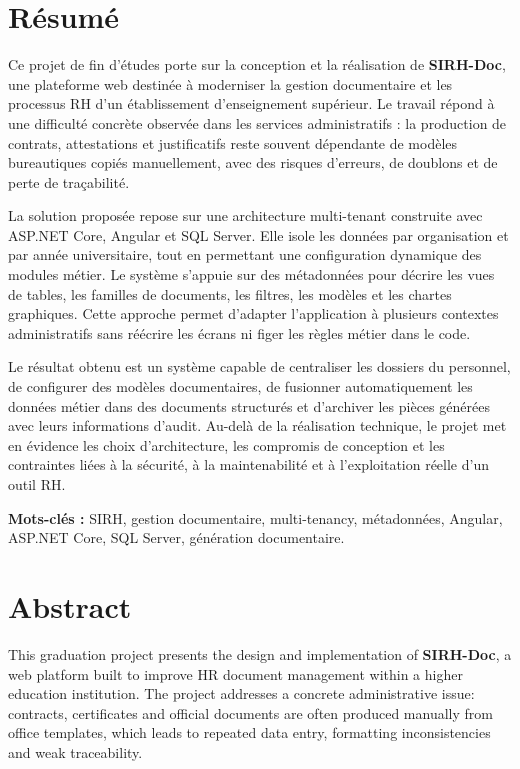 \chapter*{Résumé}

Ce projet de fin d'études porte sur la conception et la réalisation de \textbf{SIRH-Doc}, une plateforme web destinée à moderniser la gestion documentaire et les processus RH d'un établissement d'enseignement supérieur. Le travail répond à une difficulté concrète observée dans les services administratifs : la production de contrats, attestations et justificatifs reste souvent dépendante de modèles bureautiques copiés manuellement, avec des risques d'erreurs, de doublons et de perte de traçabilité.

La solution proposée repose sur une architecture multi-tenant construite avec ASP.NET Core, Angular et SQL Server. Elle isole les données par organisation et par année universitaire, tout en permettant une configuration dynamique des modules métier. Le système s'appuie sur des métadonnées pour décrire les vues de tables, les familles de documents, les filtres, les modèles et les chartes graphiques. Cette approche permet d'adapter l'application à plusieurs contextes administratifs sans réécrire les écrans ni figer les règles métier dans le code.

Le résultat obtenu est un système capable de centraliser les dossiers du personnel, de configurer des modèles documentaires, de fusionner automatiquement les données métier dans des documents structurés et d'archiver les pièces générées avec leurs informations d'audit. Au-delà de la réalisation technique, le projet met en évidence les choix d'architecture, les compromis de conception et les contraintes liées à la sécurité, à la maintenabilité et à l'exploitation réelle d'un outil RH.

\textbf{Mots-clés :} SIRH, gestion documentaire, multi-tenancy, métadonnées, Angular, ASP.NET Core, SQL Server, génération documentaire.

\strut \vfill

\chapter*{Abstract}

This graduation project presents the design and implementation of \textbf{SIRH-Doc}, a web platform built to improve HR document management within a higher education institution. The project addresses a concrete administrative issue: contracts, certificates and official documents are often produced manually from office templates, which leads to repeated data entry, formatting inconsistencies and weak traceability.

